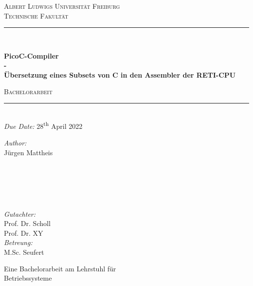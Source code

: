 \documentclass{scrreprt}
\begin{document}
  \begin{titlepage}
    \vspace{1cm}
    \center
    \textsc{\LARGE Albert Ludwigs Universität Freiburg}\\[0.5cm]
    \textsc{\Large Technische Fakultät}\\[2.0cm]

    \rule{\linewidth}{0.5mm}\\[0.4cm]
      {\huge \bfseries PicoC-Compiler\\\LARGE - \\ Übersetzung eines Subsets von C in den Assembler der RETI-CPU\par}
      \vspace{0.5cm}
      \textsc{\large Bachelorarbeit}\\
      \rule{\linewidth}{0.5mm}\\[0.5cm]

    {\large \emph{Due Date:} 28\textsuperscript{th} April 2022}\\[2.5cm]

    \begin{minipage}{0.45\textwidth}
      \begin{flushleft} \large
        \emph{Author:}\\
        Jürgen Mattheis\\
        \hspace{1cm}\\
        \hspace{1cm}\\
        \hspace{1cm}\\
        \hspace{1cm}
      \end{flushleft}
    \end{minipage}
    ~
    \begin{minipage}{0.45\textwidth}
      \begin{flushright} \large
        \emph{Gutachter:}\\
        Prof. Dr. Scholl\\
        Prof. Dr. XY\\[0.64cm]
        \emph{Betreung:}\\
        M.Sc. Seufert\\
      \end{flushright}
    \end{minipage}

    \vspace{9.5cm}
    \large{Eine Bachelorarbeit am Lehrstuhl für}\\
    \large{Betriebssysteme}
  \end{titlepage}
  \tableofcontents
\end{document}
